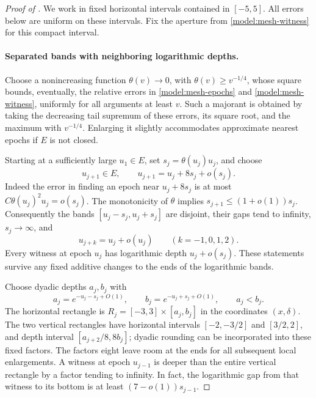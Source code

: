 \begin{proof}[Proof of ]
We work in fixed horizontal intervals contained in \([-5,5]\).  All
errors below are uniform on these intervals.  Fix the aperture from
\eqref{model:mesh-witness} for this compact interval.

\paragraph{Separated bands with neighboring logarithmic depths.}
Choose a nonincreasing function \(\theta(v)\to0\), with
\(\theta(v)\ge v^{-1/4}\), whose square bounds, eventually, the
relative errors in \eqref{model:mesh-epochs} and
\eqref{model:mesh-witness}, uniformly for all arguments at least \(v\).
Such a majorant is obtained by taking the decreasing tail supremum of
these errors, its square root, and the maximum with \(v^{-1/4}\).
Enlarging it slightly accommodates approximate nearest epochs if
\(E\) is not closed.

Starting at a sufficiently large \(u_1\in E\), set
\(s_j=\theta(u_j)u_j\), and choose
\begin{equation}
 u_{j+1}\in E,\qquad
 u_{j+1}=u_j+8s_j+o(s_j).
 \label{model:mesh-band-spacing}
\end{equation}
Indeed the error in finding an epoch near \(u_j+8s_j\) is at most
\(C\theta(u_j)^2u_j=o(s_j)\).
The monotonicity of \(\theta\) implies
\(s_{j+1}\le(1+o(1))s_j\).  Consequently the bands
\([u_j-s_j,u_j+s_j]\) are disjoint, their gaps tend to infinity,
\(s_j\to\infty\), and
\begin{equation}
 u_{j+k}=u_j+o(u_j)\qquad (k=-1,0,1,2).
 \label{model:mesh-neighboring-scales}
\end{equation}
Every witness at epoch \(u_j\) has logarithmic depth
\(u_j+o(s_j)\).  These statements survive any fixed additive changes
to the ends of the logarithmic bands.

Choose dyadic depths \(a_j,b_j\) with
\[
 a_j=e^{-u_j-s_j+O(1)},\qquad
 b_j=e^{-u_j+s_j+O(1)},\qquad a_j<b_j.
\]
The horizontal rectangle is
\(R_j=[-3,3]\times[a_j,b_j]\) in the coordinates \((x,\delta)\).
The two vertical rectangles have horizontal intervals
\([-2,-3/2]\) and \([3/2,2]\), and depth interval
\([a_{j+2}/8,8b_j]\); dyadic rounding can be incorporated into these
fixed factors.  The factors eight leave room at the ends for all
subsequent local enlargements.  A witness at epoch \(u_{j-1}\) is
deeper than the entire vertical rectangle by a factor tending to
infinity.  In fact, the logarithmic gap from that witness to its bottom
is at least \((7-o(1))s_{j-1}\).


\end{proof}
